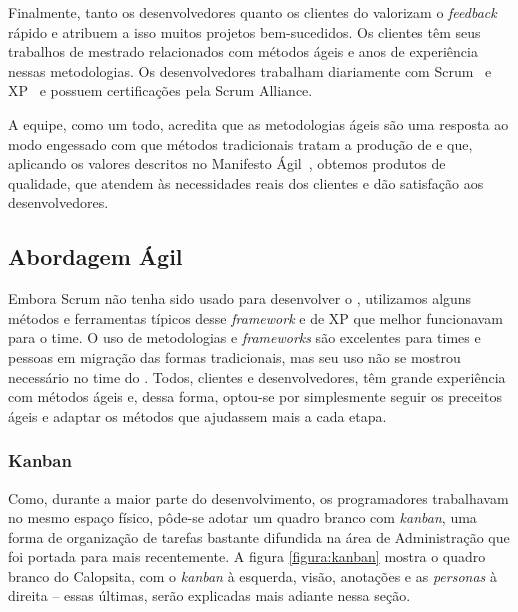 Finalmente, tanto os desenvolvedores quanto os clientes do \calopsita{} valorizam o \textit{feedback} rápido e atribuem a isso muitos projetos bem-sucedidos. Os clientes têm seus trabalhos de mestrado relacionados com métodos ágeis e anos de experiência nessas metodologias. Os desenvolvedores trabalham diariamente com Scrum~\cite{scrum} e XP~\cite{xp} e possuem certificações pela Scrum Alliance. 

A equipe, como um todo, acredita que as metodologias ágeis são uma resposta ao modo engessado com que métodos tradicionais tratam a produção de \software{} e que, aplicando os valores descritos no Manifesto Ágil~\cite{manifesto}, obtemos produtos de qualidade, que atendem às necessidades reais dos clientes e dão satisfação aos desenvolvedores.  

\subsection{Abordagem Ágil}

Embora Scrum não tenha sido usado para desenvolver o \calopsita{}, utilizamos alguns métodos e ferramentas típicos desse
\textit{framework} e de XP que melhor funcionavam para o time. O uso de metodologias e \textit{frameworks} são excelentes para
times e pessoas em migração das formas tradicionais, mas seu uso não se mostrou necessário no time do \calopsita{}. Todos,
clientes e desenvolvedores, têm grande experiência com métodos ágeis e, dessa forma, optou-se por simplesmente seguir os
preceitos ágeis e adaptar os métodos que ajudassem mais a cada etapa. 

\subsubsection*{Kanban~\cite{kanban}}

Como, durante a maior parte do desenvolvimento, os programadores trabalhavam no mesmo espaço físico, pôde-se adotar um quadro branco com \textit{kanban}, uma forma de organização de tarefas bastante difundida na área de Administração que foi portada para \software{} mais recentemente. A figura \ref{figura:kanban} mostra o quadro branco do Calopsita, com o \textit{kanban} à esquerda, visão, anotações e as \textit{personas} à direita -- essas últimas, serão explicadas mais adiante nessa seção.

